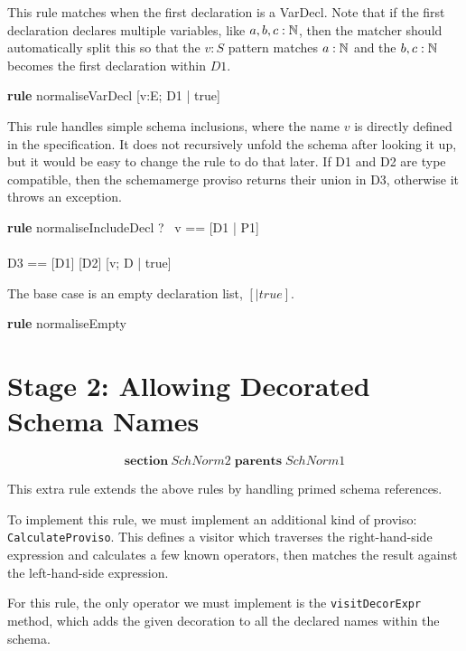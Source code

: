\documentclass{article}
\newenvironment{zsection}{\[}{\]}
\newcommand{\SECTION}{\textbf{section}~}
\newcommand{\parents}{\mathrel{\textbf{parents}}}
\newenvironment{zedrule}[1]{\par\textbf{rule }#1\vspace{-1ex}\infrule}{\endinfrule}
\newcommand{\derives}{\derive{}}
\newcommand{\proviso}{\raisebox{0.5ex}{${}_{\blacktriangleright}\ $}}%
\newcommand{\schemamerge}{\mathbin{\textbf{schemamerge}}}
\begin{document}
This rule matches when the first declaration is a VarDecl.
Note that if the first declaration declares multiple variables,
like $a,b,c:{\mathbb N}$, then the matcher should automatically split this
so that the $v:S$ pattern matches $a:{\mathbb N}$ and the $b,c:{\mathbb N}$
becomes the first declaration within $D1$.
\begin{zedrule}{normaliseVarDecl}
   [D1 | true] \unfoldsTo [D2 | P2]
\derives
   [v:E; D1 | true] \unfoldsTo [v:E; D2 | P2]
\end{zedrule}

This rule handles simple schema inclusions, where the name
$v$ is directly defined in the specification.  It does not
recursively unfold the schema after looking it up, but it would
be easy to change the rule to do that later.  If D1 and D2 are 
type compatible, then the schemamerge proviso returns their
union in D3, otherwise it throws an exception.

\begin{zedrule}{normaliseIncludeDecl}
   \proviso ?~ v == [D1 | P1] \\
   [D | true] \unfoldsTo [D2 | P2] \\
   \proviso D3 == [D1] \schemamerge [D2]
\derives
   [v; D | true] \unfoldsTo [D3 | P1 \land P2]
\end{zedrule}

The base case is an empty declaration list, $[|true]$.
\begin{zedrule}{normaliseEmpty}
   [~ | true] \unfoldsTo [~ | true]
\end{zedrule}


\section*{Stage 2: Allowing Decorated Schema Names}

\begin{zsection}
  \SECTION SchNorm2 \parents SchNorm1
\end{zsection}

This extra rule extends the above rules by handling primed schema
references.

To implement this rule, we must implement an additional kind of
proviso: \verb!CalculateProviso!.  This defines a visitor which
traverses the right-hand-side expression and calculates a few known
operators, then matches the result against the left-hand-side expression.

For this rule, the only operator we must implement is the
\verb!visitDecorExpr! method, which adds the given decoration to all the
declared names within the schema.
\end{document}
